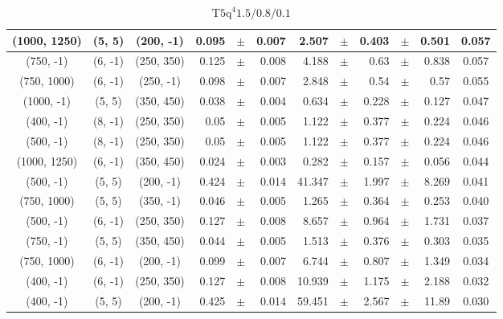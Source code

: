 \documentclass[12pt]{paper}
\newcommand{\TFiveqqqqHL}{\ensuremath{\textrm{T5q}^{4} 1.5/0.8/0.1}\xspace}
\begin{document}
\begin{table}[ht]
\begin{center}
{\begin{tabular}{|c|c|c|rrr|rrrrr|c|}
(1000, 1250)&(5, 5)&(200, -1)&0.095&$\pm$&0.007&2.507&$\pm$&0.403&$\pm$&0.501&0.057\\\hline
(750, -1)&(6, -1)&(250, 350)&0.125&$\pm$&0.008&4.188&$\pm$&0.63&$\pm$&0.838&0.057\\\hline
(750, 1000)&(6, -1)&(250, -1)&0.098&$\pm$&0.007&2.848&$\pm$&0.54&$\pm$&0.57&0.055\\\hline
(1000, -1)&(5, 5)&(350, 450)&0.038&$\pm$&0.004&0.634&$\pm$&0.228&$\pm$&0.127&0.047\\\hline
(400, -1)&(8, -1)&(250, 350)&0.05&$\pm$&0.005&1.122&$\pm$&0.377&$\pm$&0.224&0.046\\\hline
(500, -1)&(8, -1)&(250, 350)&0.05&$\pm$&0.005&1.122&$\pm$&0.377&$\pm$&0.224&0.046\\\hline
(1000, 1250)&(6, -1)&(350, 450)&0.024&$\pm$&0.003&0.282&$\pm$&0.157&$\pm$&0.056&0.044\\\hline
(500, -1)&(5, 5)&(200, -1)&0.424&$\pm$&0.014&41.347&$\pm$&1.997&$\pm$&8.269&0.041\\\hline
(750, 1000)&(5, 5)&(350, -1)&0.046&$\pm$&0.005&1.265&$\pm$&0.364&$\pm$&0.253&0.040\\\hline
(500, -1)&(6, -1)&(250, 350)&0.127&$\pm$&0.008&8.657&$\pm$&0.964&$\pm$&1.731&0.037\\\hline
(750, -1)&(5, 5)&(350, 450)&0.044&$\pm$&0.005&1.513&$\pm$&0.376&$\pm$&0.303&0.035\\\hline
(750, 1000)&(6, -1)&(200, -1)&0.099&$\pm$&0.007&6.744&$\pm$&0.807&$\pm$&1.349&0.034\\\hline
(400, -1)&(6, -1)&(250, 350)&0.127&$\pm$&0.008&10.939&$\pm$&1.175&$\pm$&2.188&0.032\\\hline
(400, -1)&(5, 5)&(200, -1)&0.425&$\pm$&0.014&59.451&$\pm$&2.567&$\pm$&11.89&0.030\\\hline
\end{tabular}}\end{center}\caption{\TFiveqqqqHL}\end{table}
\end{document}
